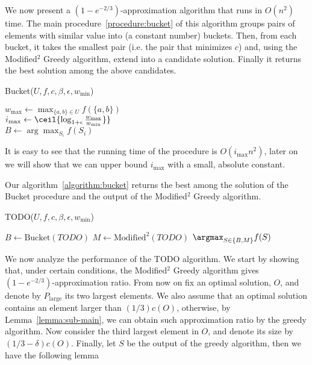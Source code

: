 \def\pLarge{P_{\text{large}}}
\def\pValuable{P_{\text{valuable}}}

We now present a $(1-e^{-2/3})$-approximation algorithm that runs in $O(n^2)$ time.
The main procedure~\ref{procedure:bucket} of this algorithm  groups pairs of elements with similar value into (a constant number) buckets.
Then, from each bucket, it takes the smallest pair (i.e. the pair that minimizes $c$) and, using the Modified$^2$ Greedy algorithm, extend into a candidate solution.
Finally it returns the best solution among the above candidates.

\begin{procedure}
	\caption{Bucket($U, f, c, \beta, \epsilon, w_{\min}$)}
	\label{procedure:bucket}
	$w_{\max} \leftarrow \max_{\{a, b\} \in U}f(\{a, b\})$
	\\
	$i_{\max} \leftarrow \ceil{\log_{1 + \epsilon}\frac{w_{\max}}{w_{\min}}\}}$
	\\
	$B \leftarrow \arg\max_{S_i}f(S_i)$
	\\
\end{procedure}

It is easy to see that the running time of the procedure is $O(i_{\max}n^2)$,
later on we will show that we can upper bound $i_{\max}$ with a small, absolute constant.

Our algorithm~\ref{algorithm:bucket} returns the best among the solution of the Bucket procedure and the output of the Modified$^2$ Greedy algorithm.

\begin{algorithm}
	\caption{
		\label{algorithm:bucket}
		TODO($U, f, c, \beta, \epsilon, w_{\min}$)
	}
	$B \leftarrow \text{Bucket}(TODO)$
	$M \leftarrow \text{Modified}^2(TODO)$
	\Return $\argmax_{S \in \{B, M\}}f(S)$
\end{algorithm}

We now analyze the performance of the TODO algorithm.
We start by showing that,  under certain conditions, the Modified$^2$ Greedy algorithm gives $(1 - e^{-2/3})$-approximation ratio.
From now on fix an optimal solution, $O$, and denote by $\pLarge$ its two largest elements.
We also assume that an optimal solution contains an element larger than $(1/3)c(O)$, otherwise, by Lemma~\ref{lemma:sub-main}, we can obtain such approximation ratio by the greedy algorithm.
Now consider the third largest element in $O$, and denote its size by $(1/3 - \delta)c(O)$.
Finally, let $S$ be the output of the greedy algorithm, then we have the following lemma

